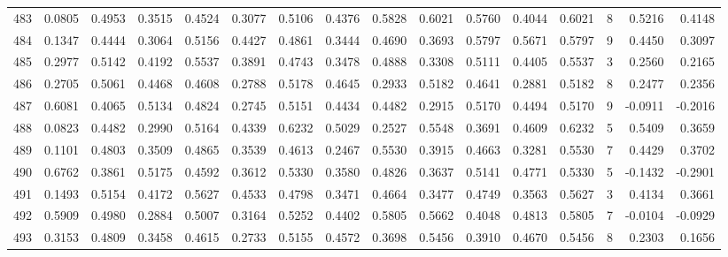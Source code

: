 \begin{tabular}{lrrrrrrrrrrrrrrr}
483 &      0.0805 &  0.4953 &  0.3515 &  0.4524 &  0.3077 &  0.5106 &  0.4376 &  0.5828 &  0.6021 &  0.5760 &   0.4044 &     0.6021 &      8 &                    0.5216 &                     0.4148 \\
484 &      0.1347 &  0.4444 &  0.3064 &  0.5156 &  0.4427 &  0.4861 &  0.3444 &  0.4690 &  0.3693 &  0.5797 &   0.5671 &     0.5797 &      9 &                    0.4450 &                     0.3097 \\
485 &      0.2977 &  0.5142 &  0.4192 &  0.5537 &  0.3891 &  0.4743 &  0.3478 &  0.4888 &  0.3308 &  0.5111 &   0.4405 &     0.5537 &      3 &                    0.2560 &                     0.2165 \\
486 &      0.2705 &  0.5061 &  0.4468 &  0.4608 &  0.2788 &  0.5178 &  0.4645 &  0.2933 &  0.5182 &  0.4641 &   0.2881 &     0.5182 &      8 &                    0.2477 &                     0.2356 \\
487 &      0.6081 &  0.4065 &  0.5134 &  0.4824 &  0.2745 &  0.5151 &  0.4434 &  0.4482 &  0.2915 &  0.5170 &   0.4494 &     0.5170 &      9 &                   -0.0911 &                    -0.2016 \\
488 &      0.0823 &  0.4482 &  0.2990 &  0.5164 &  0.4339 &  0.6232 &  0.5029 &  0.2527 &  0.5548 &  0.3691 &   0.4609 &     0.6232 &      5 &                    0.5409 &                     0.3659 \\
489 &      0.1101 &  0.4803 &  0.3509 &  0.4865 &  0.3539 &  0.4613 &  0.2467 &  0.5530 &  0.3915 &  0.4663 &   0.3281 &     0.5530 &      7 &                    0.4429 &                     0.3702 \\
490 &      0.6762 &  0.3861 &  0.5175 &  0.4592 &  0.3612 &  0.5330 &  0.3580 &  0.4826 &  0.3637 &  0.5141 &   0.4771 &     0.5330 &      5 &                   -0.1432 &                    -0.2901 \\
491 &      0.1493 &  0.5154 &  0.4172 &  0.5627 &  0.4533 &  0.4798 &  0.3471 &  0.4664 &  0.3477 &  0.4749 &   0.3563 &     0.5627 &      3 &                    0.4134 &                     0.3661 \\
492 &      0.5909 &  0.4980 &  0.2884 &  0.5007 &  0.3164 &  0.5252 &  0.4402 &  0.5805 &  0.5662 &  0.4048 &   0.4813 &     0.5805 &      7 &                   -0.0104 &                    -0.0929 \\
493 &      0.3153 &  0.4809 &  0.3458 &  0.4615 &  0.2733 &  0.5155 &  0.4572 &  0.3698 &  0.5456 &  0.3910 &   0.4670 &     0.5456 &      8 &                    0.2303 &                     0.1656 \\

\end{tabular}
